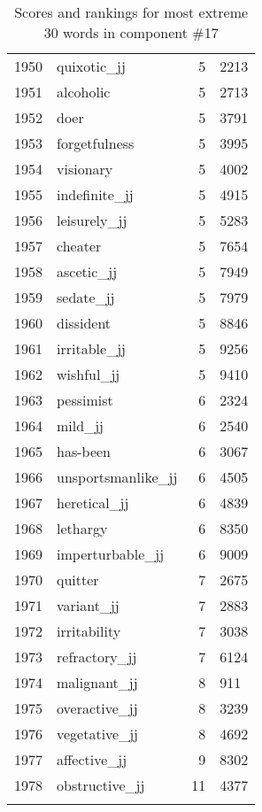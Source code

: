 \begin{longtable}[!htbp]{| rlr@{.}l |}
    1950 & quixotic\_jj & 5 & 2213 \\
    1951 & alcoholic & 5 & 2713 \\
    1952 & doer & 5 & 3791 \\
    1953 & forgetfulness & 5 & 3995 \\
    1954 & visionary & 5 & 4002 \\
    1955 & indefinite\_jj & 5 & 4915 \\
    1956 & leisurely\_jj & 5 & 5283 \\
    1957 & cheater & 5 & 7654 \\
    1958 & ascetic\_jj & 5 & 7949 \\
    1959 & sedate\_jj & 5 & 7979 \\
    1960 & dissident & 5 & 8846 \\
    1961 & irritable\_jj & 5 & 9256 \\
    1962 & wishful\_jj & 5 & 9410 \\
    1963 & pessimist & 6 & 2324 \\
    1964 & mild\_jj & 6 & 2540 \\
    1965 & has-been & 6 & 3067 \\
    1966 & unsportsmanlike\_jj & 6 & 4505 \\
    1967 & heretical\_jj & 6 & 4839 \\
    1968 & lethargy & 6 & 8350 \\
    1969 & imperturbable\_jj & 6 & 9009 \\
    1970 & quitter & 7 & 2675 \\
    1971 & variant\_jj & 7 & 2883 \\
    1972 & irritability & 7 & 3038 \\
    1973 & refractory\_jj & 7 & 6124 \\
    1974 & malignant\_jj & 8 & 911 \\
    1975 & overactive\_jj & 8 & 3239 \\
    1976 & vegetative\_jj & 8 & 4692 \\
    1977 & affective\_jj & 9 & 8302 \\
    1978 & obstructive\_jj & 11 & 4377 \\
    \hline
    \caption{Scores and rankings for most extreme 30 words in component \#17} \\
\end{longtable}
